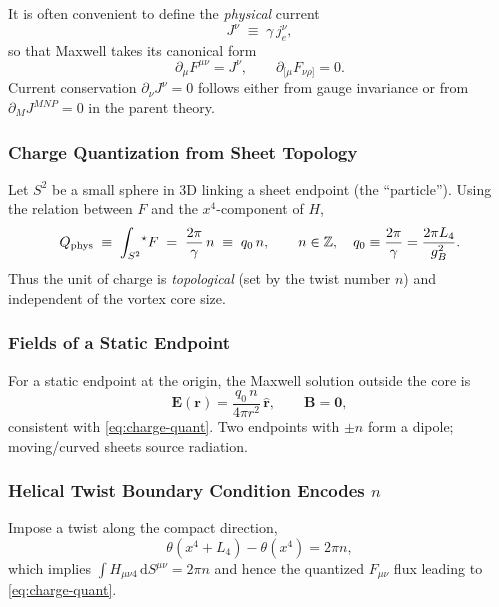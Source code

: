 It is often convenient to define the \emph{physical} current
\begin{equation}
J^\nu \;\equiv\; \gamma\, j_e^\nu,
\end{equation}
so that Maxwell takes its canonical form
\begin{equation}
\partial_\mu F^{\mu\nu}=J^\nu,\qquad \partial_{[\mu}F_{\nu\rho]}=0.
\end{equation}
Current conservation $\partial_\nu J^\nu=0$ follows either from gauge invariance or from $\partial_M J^{MNP}=0$ in the parent theory.

\subsubsection{Charge Quantization from Sheet Topology}
Let $S^2$ be a small sphere in 3D linking a sheet endpoint (the ``particle''). Using the relation between $F$ and the $x^4$-component of $H$,
\begin{equation}
Q_{\rm phys}\;\equiv\;\int_{S^2}\! {}^\star F
\;=\;\frac{2\pi}{\gamma}\,n
\;\equiv\; q_0\, n,\qquad n\in\mathbb Z,\quad q_0\equiv\frac{2\pi}{\gamma}=\frac{2\pi L_4}{g_B^2}.
\label{eq:charge-quant}
\end{equation}
Thus the unit of charge is \emph{topological} (set by the twist number $n$) and independent of the vortex core size.

\subsubsection{Fields of a Static Endpoint}
For a static endpoint at the origin, the Maxwell solution outside the core is
\begin{equation}
\mathbf E(\mathbf r)=\frac{q_0\,n}{4\pi r^2}\,\hat{\mathbf r},\qquad \mathbf B=\mathbf 0,
\end{equation}
consistent with \eqref{eq:charge-quant}. Two endpoints with $\pm n$ form a dipole; moving/curved sheets source radiation.

\subsubsection{Helical Twist Boundary Condition Encodes $n$}
Impose a twist along the compact direction,
\begin{equation}
\theta(x^4+L_4)-\theta(x^4)=2\pi n,
\end{equation}
which implies $\int H_{\mu\nu 4}\,\mathrm dS^{\mu\nu}=2\pi n$ and hence the quantized $F_{\mu\nu}$ flux leading to \eqref{eq:charge-quant}.

